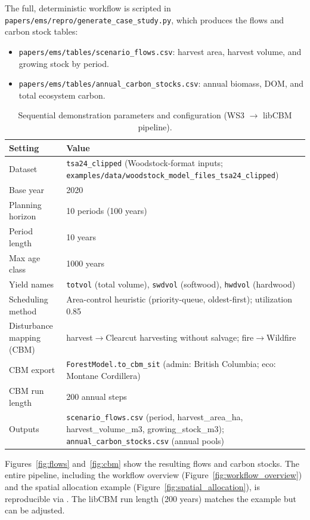 \documentclass[review]{elsarticle}
\begin{document}
The full, deterministic workflow is scripted in \texttt{papers/ems/repro/generate\_case\_study.py}, which produces the flows and carbon stock tables:
\begin{itemize}
  \item \texttt{papers/ems/tables/scenario\_flows.csv}: harvest area, harvest volume, and growing stock by period.
  \item \texttt{papers/ems/tables/annual\_carbon\_stocks.csv}: annual biomass, DOM, and total ecosystem carbon.
\end{itemize}
\begin{table}[h]
\centering
\caption{Sequential demonstration parameters and configuration (WS3 $\to$ libCBM pipeline).}
\begin{tabular}{p{4.2cm}p{9.5cm}}
\toprule
Setting & Value \\
\midrule
Dataset & \texttt{tsa24\_clipped} (Woodstock-format inputs; \texttt{examples/data/woodstock\_model\_files\_tsa24\_clipped}) \\
Base year & 2020 \\
Planning horizon & 10 periods (100 years) \\
Period length & 10 years \\
Max age class & 1000 years \\
Yield names & \texttt{totvol} (total volume), \texttt{swdvol} (softwood), \texttt{hwdvol} (hardwood) \\
Scheduling method & Area-control heuristic (priority-queue, oldest-first); utilization 0.85 \\
Disturbance mapping (CBM) & harvest$\to$Clearcut harvesting without salvage; fire$\to$Wildfire \\
CBM export & \texttt{ForestModel.to\_cbm\_sit} (admin: British Columbia; eco: Montane Cordillera) \\
CBM run length & 200 annual steps \\
Outputs & \texttt{scenario\_flows.csv} (period, harvest\_area\_ha, harvest\_volume\_m3, growing\_stock\_m3); \texttt{annual\_carbon\_stocks.csv} (annual pools) \\
\bottomrule
\end{tabular}
\label{tab:case_params}
\end{table}

Figures~\ref{fig:flows} and~\ref{fig:cbm} show the resulting flows and carbon stocks. The entire pipeline, including the workflow overview (Figure~\ref{fig:workflow_overview}) and the spatial allocation example (Figure~\ref{fig:spatial_allocation}), is reproducible via . The libCBM run length (200 years) matches the example but can be adjusted.
\end{document}
